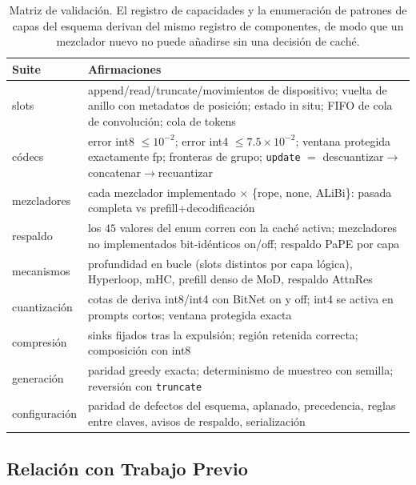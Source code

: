 \begin{table}[H]
\centering
\small
\begin{tabularx}{0.98\linewidth}{l X}
\toprule
\textbf{Suite} & \textbf{Afirmaciones} \\
\midrule
slots & append/read/truncate/movimientos de dispositivo; vuelta de anillo con metadatos de posición; estado in situ; FIFO de cola de convolución; cola de tokens \\
códecs & error int8 $\le 10^{-2}$; error int4 $\le 7.5\times10^{-2}$; ventana protegida exactamente fp; fronteras de grupo; \texttt{update} $=$ descuantizar$\to$concatenar$\to$recuantizar \\
mezcladores & cada mezclador implementado $\times$ \{rope, none, ALiBi\}: pasada completa vs prefill+decodificación \\
respaldo & los $45$ valores del enum corren con la caché activa; mezcladores no implementados bit-idénticos on/off; respaldo PaPE por capa \\
mecanismos & profundidad en bucle (slots distintos por capa lógica), Hyperloop, mHC, prefill denso de MoD, respaldo AttnRes \\
cuantización & cotas de deriva int8/int4 con BitNet on y off; int4 se activa en prompts cortos; ventana protegida exacta \\
compresión & sinks fijados tras la expulsión; región retenida correcta; composición con int8 \\
generación & paridad greedy exacta; determinismo de muestreo con semilla; reversión con \texttt{truncate} \\
configuración & paridad de defectos del esquema, aplanado, precedencia, reglas entre claves, avisos de respaldo, serialización \\
\bottomrule
\end{tabularx}
\caption{Matriz de validación. El registro de capacidades y la enumeración de patrones de capas del esquema derivan del mismo registro de componentes, de modo que un mezclador nuevo no puede añadirse sin una decisión de caché.}
\label{tab:kv-tests}
\end{table}

\subsection{Relación con Trabajo Previo}

